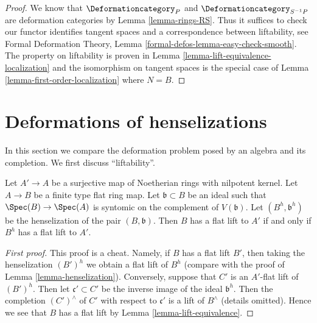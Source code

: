 \begin{proof}
We know that $\Deformationcategory_P$ and $\Deformationcategory_{S^{-1}P}$
are deformation categories by Lemma \ref{lemma-rings-RS}.
Thus it suffices to check
our functor identifies tangent spaces and a correspondence
between liftability, see
Formal Deformation Theory, Lemma \ref{formal-defos-lemma-easy-check-smooth}.
The property on liftability is proven in
Lemma \ref{lemma-lift-equivalence-localization}
and the isomorphism on tangent spaces is the special case of
Lemma \ref{lemma-first-order-localization} where $N = B$.
\end{proof}



\section{Deformations of henselizations}
\label{section-compare-henselization}

\noindent
In this section we compare the deformation problem posed
by an algebra and its completion.
We first discuss ``liftability''.

\begin{lemma}
\label{lemma-lift-equivalence-henselization}
Let $A' \to A$ be a surjective map of Noetherian rings with nilpotent kernel.
Let $A \to B$ be a finite type flat ring map.
Let $\mathfrak b \subset B$ be an ideal such that
$\Spec(B) \to \Spec(A)$ is syntomic on the complement of $V(\mathfrak b)$.
Let $(B^h, \mathfrak b^h)$ be the henselization of the pair $(B, \mathfrak b)$.
Then $B$ has a flat lift to $A'$ if and only if $B^h$ has a flat lift to $A'$.
\end{lemma}

\begin{proof}[First proof]
This proof is a cheat. Namely, if $B$ has a flat lift $B'$, then
taking the henselization $(B')^h$ we obtain a flat lift of $B^h$
(compare with the proof of Lemma \ref{lemma-henselization}).
Conversely, suppose that $C'$ is an $A'$-flat lift of $(B')^h$.
Then let $\mathfrak c' \subset C'$ be the inverse image of the
ideal $\mathfrak b^h$. Then the completion $(C')^\wedge$ of
$C'$ with respect to $\mathfrak c'$ is a lift of $B^\wedge$ (details omitted).
Hence we see that $B$ has a flat lift by
Lemma \ref{lemma-lift-equivalence}.
\end{proof}


